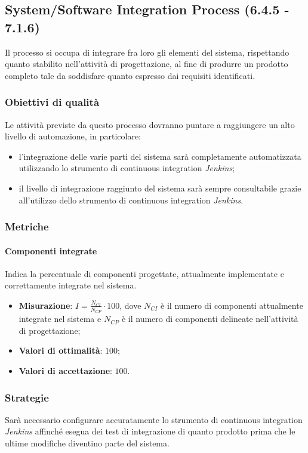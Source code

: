 \subsection{System/Software Integration Process (6.4.5 - 7.1.6)}
\label{sySoIntegration}
Il processo si occupa di integrare fra loro gli elementi del sistema, rispettando quanto stabilito nell'attività di progettazione, al fine di produrre un prodotto completo tale da soddisfare quanto espresso dai requisiti identificati.
\subsubsection{Obiettivi di qualità}
Le attività previste da questo processo dovranno puntare a raggiungere un alto livello di automazione, in particolare:
\begin{itemize}
\item l'integrazione delle varie parti del sistema sarà completamente automatizzata utilizzando lo strumento di continuous integration \textit{Jenkins};
\item il livello di integrazione raggiunto del sistema sarà sempre consultabile grazie all'utilizzo dello strumento di continuous integration \textit{Jenkins}.
\end{itemize}
\subsubsection{Metriche}
\paragraph{Componenti integrate}
\label{compInt}
Indica la percentuale di componenti progettate, attualmente implementate e correttamente integrate nel sistema.
\begin{itemize}
\item \textbf{Misurazione}: $I=\frac{N_{CI}}{N_{CP}} \cdot 100$, dove $N_{CI}$ è il numero di componenti attualmente integrate nel sistema e $N_{CP}$ è il numero di componenti delineate nell'attività di progettazione;
\item \textbf{Valori di ottimalità}: $100$;
\item \textbf{Valori di accettazione}: $100$.
\end{itemize}
\subsubsection{Strategie}
Sarà necessario configurare accuratamente lo strumento di continuous integration \textit{Jenkins} affinché esegua dei test di integrazione di quanto prodotto prima che le ultime modifiche diventino parte del sistema.
